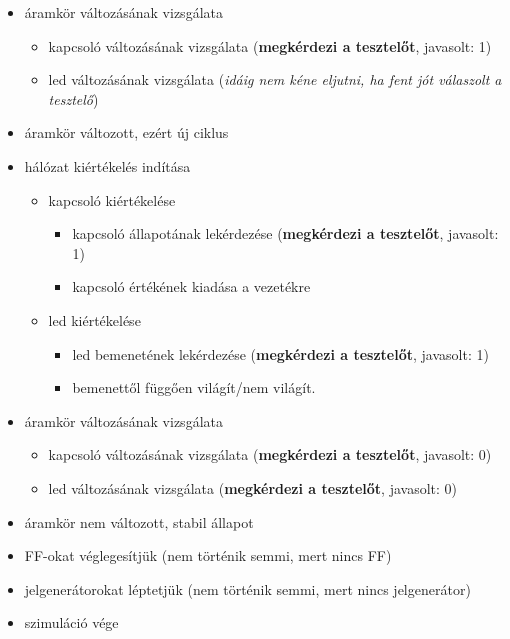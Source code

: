 {\begin{itemize}
\begin{itemize}
\begin{itemize}
\begin{itemize}
	\setlength{\itemsep}{0cm}%
	\setlength{\parskip}{0cm}%
		\item led bemenetének lekérdezése (\textbf{megkérdezi a tesztelőt}, javasolt: 1)
		\item bemenettől függően világít/nem világít.
	\end{itemize}
\end{itemize}
\item áramkör változásának vizsgálata
\begin{itemize}
\setlength{\itemsep}{0cm}%
\setlength{\parskip}{0cm}%
	\item kapcsoló változásának vizsgálata (\textbf{megkérdezi a tesztelőt}, javasolt: 1)
	\item led változásának vizsgálata (\textit{idáig nem kéne eljutni, ha fent jót válaszolt a tesztelő})
\end{itemize}
\item áramkör változott, ezért új ciklus
\item hálózat kiértékelés indítása
\begin{itemize}
\setlength{\itemsep}{0cm}%
\setlength{\parskip}{0cm}%
	\item kapcsoló kiértékelése
	\begin{itemize}
	\setlength{\itemsep}{0cm}%
	\setlength{\parskip}{0cm}%
		\item kapcsoló állapotának lekérdezése (\textbf{megkérdezi a tesztelőt}, javasolt: 1)
		\item kapcsoló értékének kiadása a vezetékre
	\end{itemize}
	\item led kiértékelése
	\begin{itemize}
	\setlength{\itemsep}{0cm}%
	\setlength{\parskip}{0cm}%
		\item led bemenetének lekérdezése (\textbf{megkérdezi a tesztelőt}, javasolt: 1)
		\item bemenettől függően világít/nem világít.
	\end{itemize}
\end{itemize}
\item áramkör változásának vizsgálata
\begin{itemize}
\setlength{\itemsep}{0cm}%
\setlength{\parskip}{0cm}%
	\item kapcsoló változásának vizsgálata (\textbf{megkérdezi a tesztelőt}, javasolt: 0)
	\item led változásának vizsgálata (\textbf{megkérdezi a tesztelőt}, javasolt: 0)
\end{itemize}
\item áramkör nem változott, stabil állapot
\item FF-okat véglegesítjük (nem történik semmi, mert nincs FF)
\item jelgenerátorokat léptetjük (nem történik semmi, mert nincs jelgenerátor)
\item szimuláció vége
\end{itemize}
\end{itemize}
\vspace{-15pt}}

